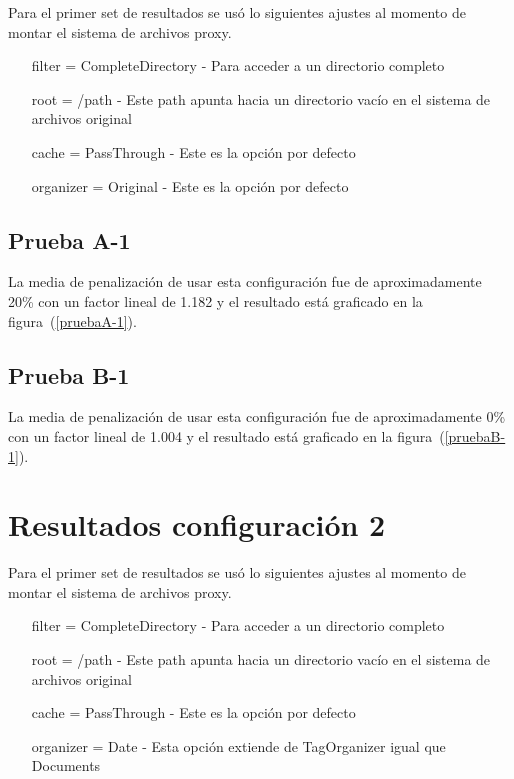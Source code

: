 Para el primer set de resultados se usó lo siguientes ajustes al momento de montar el sistema de archivos proxy.

\begin{itemize}
\item[filter] = CompleteDirectory - Para acceder a un directorio completo
\item[root] = /path - Este path apunta hacia un directorio vacío en el sistema de archivos original
\item[cache] = PassThrough - Este es la opción por defecto
\item[organizer] = Original - Este es la opción por defecto
\end{itemize}

\subsection{Prueba A-1}

La media de penalización de usar esta configuración fue de aproximadamente 20\% con un factor lineal de 1.182 y el resultado está graficado en la figura~(\ref{pruebaA-1}).


\subsection{Prueba B-1}

La media de penalización de usar esta configuración fue de aproximadamente 0\% con un factor lineal de 1.004 y el resultado está graficado en la figura~(\ref{pruebaB-1}).



\section{Resultados configuración 2}

Para el primer set de resultados se usó lo siguientes ajustes al momento de montar el sistema de archivos proxy.

\begin{itemize}
\item[filter] = CompleteDirectory - Para acceder a un directorio completo
\item[root] = /path - Este path apunta hacia un directorio vacío en el sistema de archivos original
\item[cache] = PassThrough - Este es la opción por defecto
\item[organizer] = Date - Esta opción extiende de TagOrganizer igual que Documents
\end{itemize}

